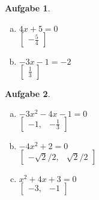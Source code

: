 \documentclass[12pt]{article}
\theoremstyle{note}
\newtheorem{aufgabe}{Aufgabe}
\begin{document}
\begin{flushleft}
\begin{aufgabe}
\begin{multicols}{3}
\begin{enumerate}[a)]
\item $4 x + 5 = 0$\\
$\begin{bmatrix}- \frac{5}{4}\end{bmatrix}$

\item $- 3 x - 1 = -2$\\
$\begin{bmatrix}\frac{1}{3}\end{bmatrix}$

\end{enumerate} 
\end{multicols} 
\end{aufgabe}\vspace{1em}\begin{aufgabe} ~ \ 
\begin{multicols}{3} 
\begin{enumerate}[a)] 
\item $- 3 x^{2} - 4 x - 1 = 0$\\
$\begin{bmatrix}-1, & - \frac{1}{3}\end{bmatrix}$

\item $- 4 x^{2} + 2 = 0$\\
$\begin{bmatrix}- \sqrt{2} / 2, & \sqrt{2} / 2\end{bmatrix}$

\item $x^{2} + 4 x + 3 = 0$\\
$\begin{bmatrix}-3, & -1\end{bmatrix}$

\end{enumerate} 
\end{multicols} 
\end{aufgabe}\vspace{1em}
\end{flushleft} 
\end{document}
